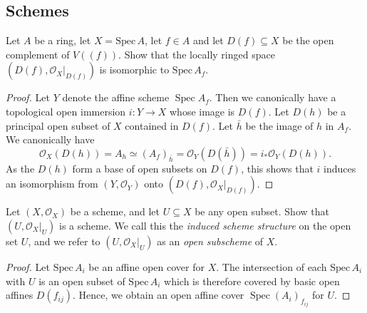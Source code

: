 \subsection{Schemes}
\begin{exe}
	\label{2.2.1}
	Let $A$ be a ring, let $X= \mathrm{Spec}\, A$, let $f \in A$ and let $D(f) \subseteq X$ be the open complement of $V((f))$. Show that the locally ringed space $\left(D(f),\mathcal{O}_{X}|_{D(f)}\right)$ is isomorphic to $\mathrm{Spec}\, A_{f}$.
\end{exe}
\begin{proof}
	Let $Y$ denote the affine scheme $\operatorname{Spec} A_{f} .$ Then we canonically have a topological open immersion $i: Y \rightarrow X$ whose image is $D(f) .$ Let $D(h)$ be a principal open subset of $X$ contained in $D(f)$. Let $\bar{h}$ be the image of $h$ in $A_{f} .$ We canonically have $$\mathcal{O}_{X}(D(h))=A_{h} \simeq\left(A_{f}\right)_{\bar{h}}=\mathcal{O}_{Y}(D(\bar{h}))=i_{*} \mathcal{O}_{Y}(D(h)) .$$ As the $D(h)$ form a base of open subsets on $D(f)$, this shows that $i$ induces an isomorphism from $\left(Y, \mathcal{O}_{Y}\right)$ onto $\left(D(f),\mathcal{O}_{X}|_{D(f)}\right)$.
\end{proof}
\begin{exe}
	\label{2.2.2}
	Let $\left(X, \mathcal{O}_{X}\right)$ be a scheme, and let $U \subseteq X$ be any open subset. Show that $\left(U,\left.\mathcal{O}_{X}\right|_{U}\right)$ is a scheme. We call this the \emph{induced scheme structure} on the open set $U$, and we refer to $(U,\mathcal{O}_X|_U)$ as an \emph{open subscheme} of $X$.
\end{exe}

\begin{proof}
	Let $\mathrm{Spec}\, A_{i}$ be an affine open cover for $X$. The intersection of each $\mathrm{Spec}\, A_{i}$ with $U$ is an open subset of $\mathrm{Spec}\, A_{i}$ which is therefore covered by basic open affines $D(f_{i j})$. Hence, we obtain an open affine cover $\operatorname{Spec}\left(A_{i}\right)_{f_{ij}}$ for $U$.
\end{proof}

